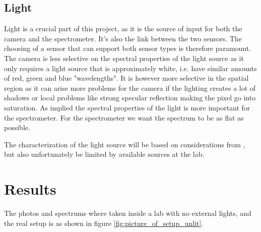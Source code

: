\documentclass{article}
\begin{document}
\subsection{Light}
Light is a crucial part of this project, as it is the source of input for both the camera and the spectrometer. It's also the link between the two sensors. The choosing of a sensor that can support both sensor types is therefore paramount. The camera is less selective on the spectral properties of the light source as it only requires a light source that is approximately white, i.e. have similar amounts of red, green and blue "wavelengths". It is however more selective in the spatial region as it can arise more problems for the camera if the lighting creates a lot of shadows or local problems like strong specular reflection making the pixel go into saturation. As implied the spectral properties of the light is more important for the spectrometer. For the spectrometer we want the spectrum to be as flat as possible. 

The characterization of the light source will be based on considerations from \cite{martinPracticalGuideMachine}, but also unfortunately be limited by available sources at the lab. %


\section{Results}
The photos and spectrums where taken inside a lab with no external lights, and the real setup is as shown in figure \ref{fig:picture_of_setup_unlit}. %
\end{document}
